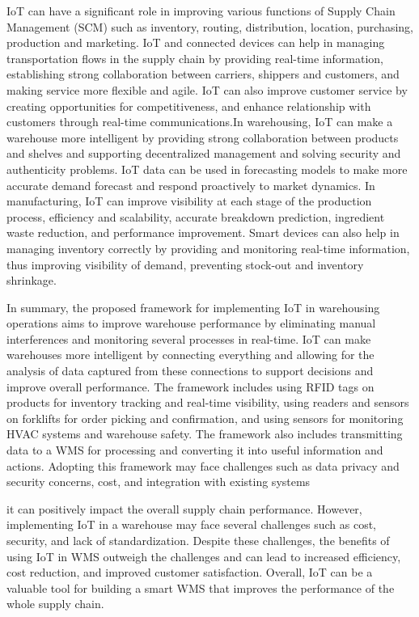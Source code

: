 \documentclass[12pt,letterpaper]{article}
\begin{document}
IoT can have a significant role in improving various functions of Supply Chain Management (SCM) such as inventory, routing, distribution, location, purchasing, production and marketing. \newline  IoT and connected devices can help in managing transportation flows in the supply chain by providing real-time information, establishing strong collaboration between carriers, shippers and customers, and making service more flexible and agile. IoT can also improve customer service by creating opportunities for competitiveness, and enhance relationship with customers through real-time communications.\newline  In warehousing, IoT can make a warehouse more intelligent by providing strong collaboration between products and shelves and supporting decentralized management and solving security and authenticity problems. IoT data can be used in forecasting models to make more accurate demand forecast and respond proactively to market dynamics. In manufacturing, IoT can improve visibility at each stage of the production process, efficiency and scalability, accurate breakdown prediction, ingredient waste reduction, and performance improvement. \newline  Smart devices can also help in managing inventory correctly by providing and monitoring real-time information, thus improving visibility of demand, preventing stock-out and inventory shrinkage.

In summary, the proposed framework for implementing IoT in warehousing operations aims to improve warehouse performance by eliminating manual interferences and monitoring several processes in real-time. \newline  IoT can make warehouses more intelligent by connecting everything and allowing for the analysis of data captured from these connections to support decisions and improve overall performance. \newline  The framework includes using RFID tags on products for inventory tracking and real-time visibility, using readers and sensors on forklifts for order picking and confirmation, and using sensors for monitoring HVAC systems and warehouse safety. \newline  The framework also includes transmitting data to a WMS for processing and converting it into useful information and actions. Adopting this framework may face challenges such as data privacy and security concerns, cost, and integration with existing systems

it can positively impact the overall supply chain performance. However, implementing IoT in a warehouse may face several challenges such as cost, security, and lack of standardization. \newline Despite these challenges, the benefits of using IoT in WMS outweigh the challenges and can lead to increased efficiency, cost reduction, and improved customer satisfaction. Overall, IoT can be a valuable tool for building a smart WMS that improves the performance of the whole supply chain.
\end{document}
